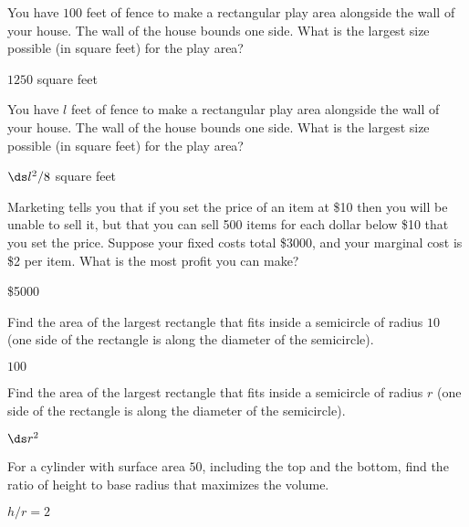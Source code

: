 \begin{enumialphparenastyle}
\begin{ex}
You have $100$ feet of fence to make a rectangular play area alongside the
wall of your house.  The wall of the house bounds one side.  What is the
largest size possible (in square feet) for the play area?
\begin{sol}
 $1250$ square feet
\end{sol}
\end{ex}

\begin{ex}
You have $l$ feet of fence to make a rectangular play area alongside the
wall of your house.  The wall of the house bounds one side.  What is the
largest size possible (in square feet) for the play area?
\begin{sol}
 $\ds l^2/8$ square feet
\end{sol}
\end{ex}

\begin{ex}
\label{ex:manufacturing}
Marketing tells you that if you set the price of an item at \$10
then you will be unable to sell it, but that you can sell 500 items for
each dollar below \$10 that you set the price.  Suppose your fixed costs total
\$3000, and your marginal cost is \$2 per item.  What is the most profit
you can make?
\begin{sol}
 \$5000
\end{sol}
\end{ex}

\begin{ex}
Find the area of the largest rectangle that fits inside a semicircle of
radius $10$ (one side of the rectangle is along the diameter of the
semicircle).
\begin{sol}
 $100$
\end{sol}
\end{ex}

\begin{ex}
Find the area of the largest rectangle that fits inside a semicircle of
radius $r$ (one side of the rectangle is along the diameter of the
semicircle).
\begin{sol}
 $\ds r^2$
\end{sol}
\end{ex}

\begin{ex}
For a cylinder with surface area $50$, including 
the top and the bottom, find the ratio of height to
base radius that maximizes the volume.
\begin{sol}
 $h/r=2$
\end{sol}
\end{ex}


\end{enumialphparenastyle}
